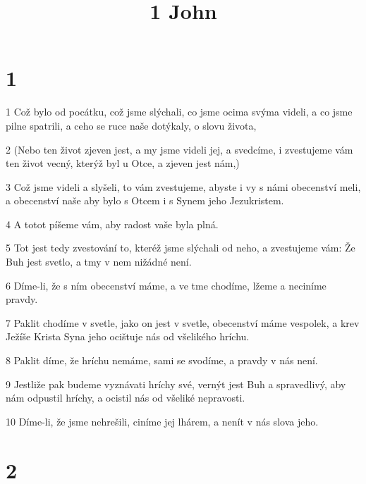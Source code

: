 

\title{1 John}

\chapter{1}

\par 1 Což bylo od pocátku, což jsme slýchali, co jsme ocima svýma videli, a co jsme pilne spatrili, a ceho se ruce naše dotýkaly, o slovu života,
\par 2 (Nebo ten život zjeven jest, a my jsme videli jej, a svedcíme, i zvestujeme vám ten život vecný, kterýž byl u Otce, a zjeven jest nám,)
\par 3 Což jsme videli a slyšeli, to vám zvestujeme, abyste i vy s námi obecenství meli, a obecenství naše aby bylo s Otcem i s Synem jeho Jezukristem.
\par 4 A totot píšeme vám, aby radost vaše byla plná.
\par 5 Tot jest tedy zvestování to, kteréž jsme slýchali od neho, a zvestujeme vám: Že Buh jest svetlo, a tmy v nem nižádné není.
\par 6 Díme-li, že s ním obecenství máme, a ve tme chodíme, lžeme a neciníme pravdy.
\par 7 Paklit chodíme v svetle, jako on jest v svetle, obecenství máme vespolek, a krev Ježíše Krista Syna jeho ocištuje nás od všelikého hríchu.
\par 8 Paklit díme, že hríchu nemáme, sami se svodíme, a pravdy v nás není.
\par 9 Jestliže pak budeme vyznávati hríchy své, vernýt jest Buh a spravedlivý, aby nám odpustil hríchy, a ocistil nás od všeliké nepravosti.
\par 10 Díme-li, že jsme nehrešili, ciníme jej lhárem, a nenít v nás slova jeho.

\chapter{2}

